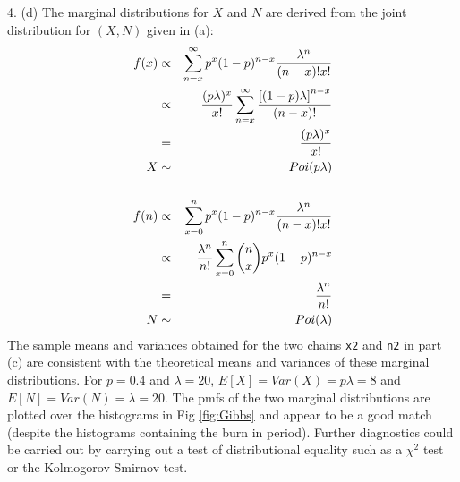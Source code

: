 \documentclass[a4paper,11pt]{article}
\begin{document}
4. (d) The marginal distributions for $X$ and $N$ are derived from the
joint distribution for $(X,N)$ given in (a):
\begin{eqnarray*}
  f(x) & \propto & \sum_{n=x}^\infty p^x(1-p)^{n-x}\frac{\lambda^n}{(n-x)!x!}\\
       & \propto & \frac{(p\lambda)^x}{x!} \sum_{n=x}^\infty \frac{\left[(1-p)\lambda\right]^{n-x}}{(n-x)!}\\
       & = & \frac{(p\lambda)^x}{x!}\\
  X    & \sim & Poi(p\lambda)\\
  \\
  f(n) & \propto & \sum_{x=0}^n p^x(1-p)^{n-x}\frac{\lambda^n}{(n-x)!x!}\\
       & \propto & \frac{\lambda^n}{n!} \sum_{x=0}^n \dbinom{n}{x}p^x(1-p)^{n-x}\\
       & = & \frac{\lambda^n}{n!}\\
   N   & \sim & Poi(\lambda)
\end{eqnarray*}
The sample means and variances obtained for the two chains
\texttt{x2} and \texttt{n2} in part (c) are consistent with the
theoretical means and variances of these marginal distributions. For
$p=0.4$ and $\lambda=20$, $E[X]=Var(X)=p\lambda=8$ and
$E[N]=Var(N)=\lambda=20$. The pmfs of the two marginal distributions
are plotted over the histograms in Fig \ref{fig:Gibbs} and appear to
be a good match (despite the histograms containing the burn in
period). Further diagnostics could be carried out by carrying out a
test of distributional equality such as a $\chi^2$ test or the
Kolmogorov-Smirnov test.
\end{document}

